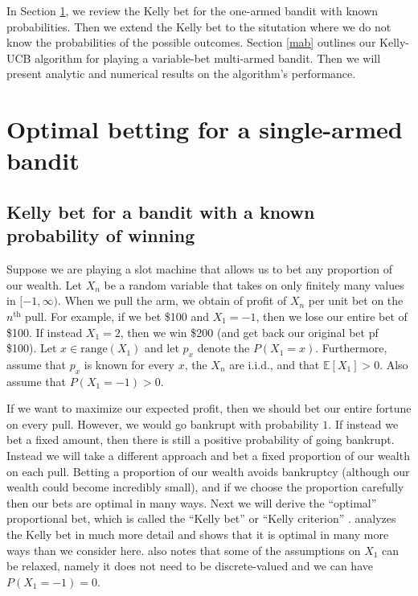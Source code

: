 \documentclass[letterpaper]{article}
\numberwithin{equation}{section}
\theoremstyle{plain}
\begin{document}
In Section \ref{singlearmed}, we review the Kelly bet for the one-armed bandit with known probabilities. Then we extend the Kelly bet to the situtation where we do not know the probabilities of the possible outcomes. Section \ref{mab} outlines our Kelly-UCB algorithm for playing a variable-bet multi-armed bandit. Then we will present analytic and numerical results on the algorithm's performance.

\section{Optimal betting for a single-armed bandit}\label{singlearmed}
\subsection{Kelly bet for a bandit with a known probability of winning}
Suppose we are playing a slot machine that allows us to bet any proportion of our wealth. Let $X_n$ be a random variable that takes on only finitely many values in $[-1,\infty)$.  When we pull the arm, we obtain of profit of $X_n$ per unit bet on the $n^\text{th}$ pull. For example, if we bet \$100 and $X_1 = -1$, then we lose our entire bet of \$100. If instead $X_1 = 2$, then we win \$200 (and get back our original bet pf \$100). Let $x\in\text{range}(X_1)$ and let $p_x$ denote the $P(X_1 = x)$. Furthermore, assume that $p_x$ is known for every $x$, the $X_n$ are i.i.d., and that $\mathbb{E}[X_1] > 0$. Also assume that $P(X_1 = -1) > 0$.

If we want to maximize our expected profit, then we should bet our entire fortune on every pull. However, we would go bankrupt with probability $1$. If instead we bet a fixed amount, then there is still a positive probability of going bankrupt. Instead we will take a different approach and bet a fixed proportion of our wealth on each pull. Betting a proportion of our wealth avoids bankruptcy (although our wealth could become incredibly small), and if we choose the proportion carefully then our bets are optimal in many ways. Next we will derive the ``optimal'' proportional bet, which is called the ``Kelly bet'' or ``Kelly criterion'' \citep{kelly1956new,thorp2006kelly}. \cite{ethier2010doctrine} analyzes the Kelly bet in much more detail and shows that it is optimal in many more ways than we consider here. \cite{ethier2010doctrine} also notes that some of the assumptions on $X_1$ can be relaxed, namely it does not need to be discrete-valued and we can have $P(X_1 = -1) =0$.
\end{document}
